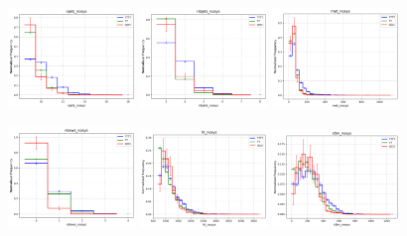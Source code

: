 \documentclass[twoside]{article}
\begin{document}
\begin{figure}[H]
    \centering
    \includegraphics[width=0.3\textwidth]{plots/evtbdt/input_vars/njets_nosys.png}
    \hfill
    \includegraphics[width=0.3\textwidth]{plots/evtbdt/input_vars/nbjets_nosys.png}
    \hfill
    \includegraphics[width=0.3\textwidth]{plots/evtbdt/input_vars/met_nosys.png}

\end{figure}

\begin{figure}[H]
    \centering
    \includegraphics[width=0.3\textwidth]{plots/evtbdt/input_vars/nbsws_nosys.png}
    \hfill
    \includegraphics[width=0.3\textwidth]{plots/evtbdt/input_vars/ht_nosys.png}
    \hfill
    \includegraphics[width=0.3\textwidth]{plots/evtbdt/input_vars/sfjm_nosys.png}
\end{figure}
\end{document}
